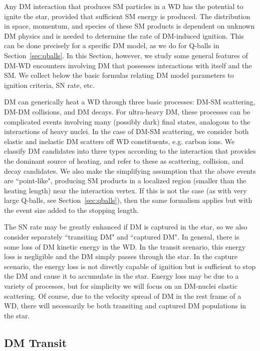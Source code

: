 Any DM interaction that produces SM particles in a WD has the potential to ignite the star, provided that sufficient SM energy is produced.
The distribution in space, momentum, and species of these SM products is dependent on unknown DM physics and is needed to determine the rate of DM-induced ignition.
This can be done precisely for a specific DM model, as we do for Q-balls in Section~\ref{sec:qballs}.
In this Section, however, we study some general features of DM-WD encounters involving DM that possesses interactions with itself and the SM.
We collect below the basic formulas relating DM model parameters to ignition criteria, SN rate, etc.

DM can generically heat a WD through three basic processes: DM-SM scattering, DM-DM collisions, and DM decays.
For ultra-heavy DM, these processes can be complicated events involving many (possibly dark) final states, analogous to the interactions of heavy nuclei.
In the case of DM-SM scattering, we consider both elastic and inelastic DM scatters off WD constituents, e.g. carbon ions. 
We classify DM candidates into three types according to the interaction that provides the dominant source of heating, and refer to these as scattering, collision, and decay candidates.
We also make the simplifying assumption that the above events are ``point-like", producing SM products in a localized region (smaller than the heating length) near the interaction vertex.
If this is not the case (as with very large Q-balls, see Section~\ref{sec:qballs}), then the same formalism applies but with the event size added to the stopping length.

The SN rate may be greatly enhanced if DM is captured in the star, so we also consider separately ``transiting DM" and ``captured DM".
In general, there is some loss of DM kinetic energy in the WD.
In the transit scenario, this energy loss is negligible and the DM simply passes through the star.
In the capture scenario, the energy loss is not directly capable of ignition but is sufficient to stop the DM and cause it to accumulate in the star.
Energy loss may be due to a variety of processes, but for simplicity we will focus on an DM-nuclei elastic scattering. 
Of course, due to the velocity spread of DM in the rest frame of a WD, there will necessarily be both transiting and captured DM populations in the star.

\subsection{DM Transit}

